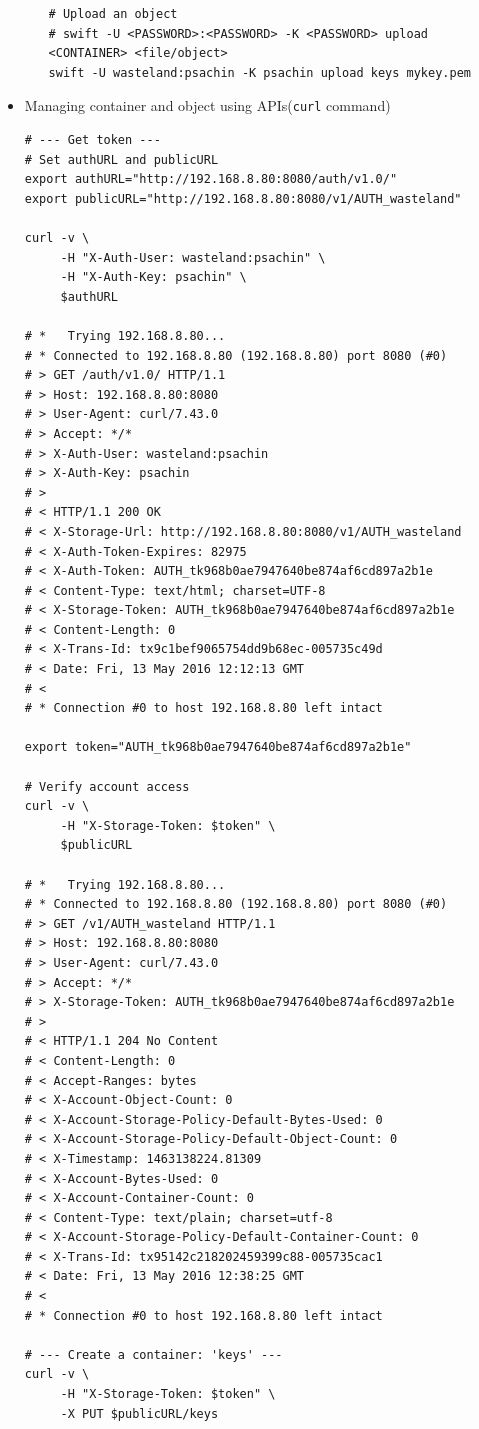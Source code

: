 \documentclass{article}
\begin{document}
\begin{itemize}
\begin{itemize}
\begin{verbatim}
# Upload an object
# swift -U <PASSWORD>:<PASSWORD> -K <PASSWORD> upload <CONTAINER> <file/object>
swift -U wasteland:psachin -K psachin upload keys mykey.pem
\end{verbatim}
\end{itemize}
\item Managing container and object using APIs(\texttt{curl} command)
\begin{verbatim}
# --- Get token ---
# Set authURL and publicURL
export authURL="http://192.168.8.80:8080/auth/v1.0/"
export publicURL="http://192.168.8.80:8080/v1/AUTH_wasteland"

curl -v \
	 -H "X-Auth-User: wasteland:psachin" \
	 -H "X-Auth-Key: psachin" \
	 $authURL

# *   Trying 192.168.8.80...
# * Connected to 192.168.8.80 (192.168.8.80) port 8080 (#0)
# > GET /auth/v1.0/ HTTP/1.1
# > Host: 192.168.8.80:8080
# > User-Agent: curl/7.43.0
# > Accept: */*
# > X-Auth-User: wasteland:psachin
# > X-Auth-Key: psachin
# >
# < HTTP/1.1 200 OK
# < X-Storage-Url: http://192.168.8.80:8080/v1/AUTH_wasteland
# < X-Auth-Token-Expires: 82975
# < X-Auth-Token: AUTH_tk968b0ae7947640be874af6cd897a2b1e
# < Content-Type: text/html; charset=UTF-8
# < X-Storage-Token: AUTH_tk968b0ae7947640be874af6cd897a2b1e
# < Content-Length: 0
# < X-Trans-Id: tx9c1bef9065754dd9b68ec-005735c49d
# < Date: Fri, 13 May 2016 12:12:13 GMT
# <
# * Connection #0 to host 192.168.8.80 left intact

export token="AUTH_tk968b0ae7947640be874af6cd897a2b1e"

# Verify account access
curl -v \
	 -H "X-Storage-Token: $token" \
	 $publicURL

# *   Trying 192.168.8.80...
# * Connected to 192.168.8.80 (192.168.8.80) port 8080 (#0)
# > GET /v1/AUTH_wasteland HTTP/1.1
# > Host: 192.168.8.80:8080
# > User-Agent: curl/7.43.0
# > Accept: */*
# > X-Storage-Token: AUTH_tk968b0ae7947640be874af6cd897a2b1e
# >
# < HTTP/1.1 204 No Content
# < Content-Length: 0
# < Accept-Ranges: bytes
# < X-Account-Object-Count: 0
# < X-Account-Storage-Policy-Default-Bytes-Used: 0
# < X-Account-Storage-Policy-Default-Object-Count: 0
# < X-Timestamp: 1463138224.81309
# < X-Account-Bytes-Used: 0
# < X-Account-Container-Count: 0
# < Content-Type: text/plain; charset=utf-8
# < X-Account-Storage-Policy-Default-Container-Count: 0
# < X-Trans-Id: tx95142c218202459399c88-005735cac1
# < Date: Fri, 13 May 2016 12:38:25 GMT
# <
# * Connection #0 to host 192.168.8.80 left intact

# --- Create a container: 'keys' ---
curl -v \
	 -H "X-Storage-Token: $token" \
	 -X PUT $publicURL/keys


\end{verbatim}
\end{itemize}
\end{document}
